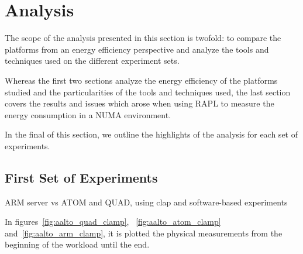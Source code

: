 \chapter{Analysis}



The scope of the analysis presented in this section is twofold: to compare the
platforms from an energy efficiency perspective and analyze the tools and techniques used on the different experiment sets. 

Whereas the first two sections analyze the energy efficiency of the platforms
studied and the particularities of the tools and techniques used, the last 
section covers the results and issues which arose when using RAPL to measure 
the energy consumption in a NUMA environment.

In the final of this section, we outline the highlights of the analysis for
each set of experiments.

\section{First Set of Experiments}
ARM server vs ATOM and QUAD, using clap and software-based experiments

In figures~\ref{fig:aalto_quad_clamp}, ~\ref{fig:aalto_atom_clamp} 
and~\ref{fig:aalto_arm_clamp}, it is plotted the physical measurements from the
beginning of the workload until the end.

